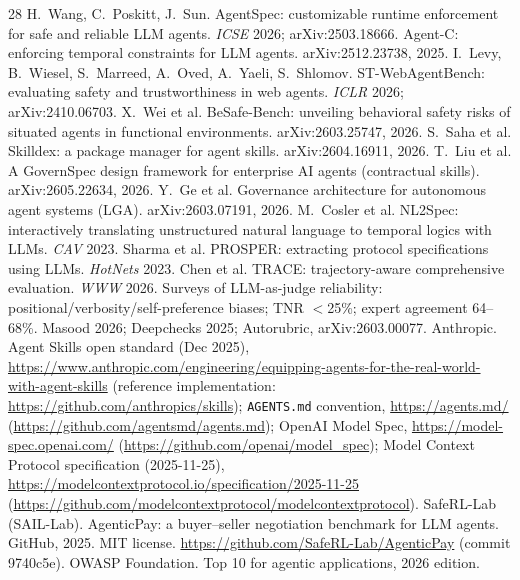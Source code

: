 \documentclass{article}
\begin{document}
\begin{thebibliography}{28}
 H.~Wang, C.~Poskitt, J.~Sun. AgentSpec: customizable runtime enforcement for safe and reliable LLM agents. \emph{ICSE} 2026; arXiv:2503.18666.
 Agent-C: enforcing temporal constraints for LLM agents. arXiv:2512.23738, 2025.
 I.~Levy, B.~Wiesel, S.~Marreed, A.~Oved, A.~Yaeli, S.~Shlomov. ST-WebAgentBench: evaluating safety and trustworthiness in web agents. \emph{ICLR} 2026; arXiv:2410.06703.
 X.~Wei et al. BeSafe-Bench: unveiling behavioral safety risks of situated agents in functional environments. arXiv:2603.25747, 2026.
 S.~Saha et al. Skilldex: a package manager for agent skills. arXiv:2604.16911, 2026.
 T.~Liu et al. A GovernSpec design framework for enterprise AI agents (contractual skills). arXiv:2605.22634, 2026.
 Y.~Ge et al. Governance architecture for autonomous agent systems (LGA). arXiv:2603.07191, 2026.
 M.~Cosler et al. NL2Spec: interactively translating unstructured natural language to temporal logics with LLMs. \emph{CAV} 2023.
 Sharma et al. PROSPER: extracting protocol specifications using LLMs. \emph{HotNets} 2023.
 Chen et al. TRACE: trajectory-aware comprehensive evaluation. \emph{WWW} 2026.
 Surveys of LLM-as-judge reliability: positional/verbosity/self-preference biases; TNR $<$25\%; expert agreement 64--68\%. Masood 2026; Deepchecks 2025; Autorubric, arXiv:2603.00077.
 Anthropic. Agent Skills open standard (Dec 2025), \url{https://www.anthropic.com/engineering/equipping-agents-for-the-real-world-with-agent-skills} (reference implementation: \url{https://github.com/anthropics/skills}); \texttt{AGENTS.md} convention, \url{https://agents.md/} (\url{https://github.com/agentsmd/agents.md}); OpenAI Model Spec, \url{https://model-spec.openai.com/} (\url{https://github.com/openai/model_spec}); Model Context Protocol specification (2025-11-25), \url{https://modelcontextprotocol.io/specification/2025-11-25} (\url{https://github.com/modelcontextprotocol/modelcontextprotocol}).
 SafeRL-Lab (SAIL-Lab). AgenticPay: a buyer--seller negotiation benchmark for LLM agents. GitHub, 2025. MIT license. \url{https://github.com/SafeRL-Lab/AgenticPay} (commit 9740c5e).
 OWASP Foundation. Top 10 for agentic applications, 2026 edition.
\end{thebibliography}
\end{document}
